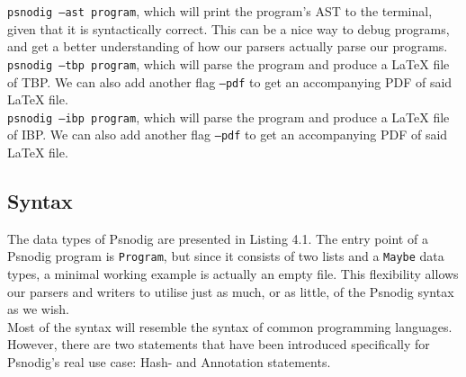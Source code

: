 \texttt{psnodig --ast program}, which will print the program's AST to the terminal, given that it is syntactically correct. This can be a nice way to debug programs, and get a better understanding of how our parsers actually parse our programs. \hfill \\

\texttt{psnodig --tbp program}, which will parse the program and produce a LaTeX file of TBP. We can also add another flag \texttt{--pdf} to get an accompanying PDF of said LaTeX file. \hfill \\

\texttt{psnodig --ibp program}, which will parse the program and produce a LaTeX file of IBP. We can also add another flag \texttt{--pdf} to get an accompanying PDF of said LaTeX file.

\subsection{Syntax}


The data types of Psnodig are presented in Listing 4.1. The entry point of a Psnodig program is \texttt{Program}, but since it consists of two lists and a \texttt{Maybe} data types, a minimal working example is actually an empty file. This flexibility allows our parsers and writers to utilise just as much, or as little, of the Psnodig syntax as we wish. \hfill \\

Most of the syntax will resemble the syntax of common programming languages. However, there are two statements that have been introduced specifically for Psnodig's real use case: Hash- and Annotation statements. \hfill \\

